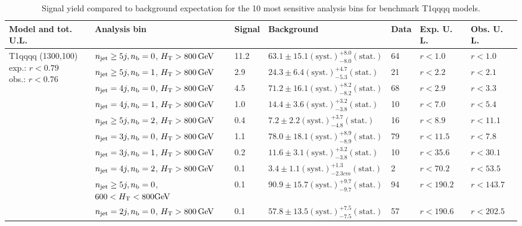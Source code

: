 \begin{table}[h!] 
  \scriptsize
  \caption{ 
Signal yield compared to background expectation for the 10 most sensitive analysis bins 
for benchmark T1qqqq models.
  \label{tab:sigBenchmarksYields_T1qqqq}}
  \centering 
  \begin{tabular}{ lllllll } 
    \hline 
    \hline 
    Model and tot. U.L. & Analysis bin & Signal & Background & Data & Exp. U. L. & Obs. U. L. \\ \hline
\multirow{10}{*}{\parbox[t]{2.3cm}{T1qqqq (1300,100)\\exp.: $r<0.79$\\obs.: $r<0.76$}}
 & $n_{\mathrm{jet}} \geq5j,n_{\text{b}} =0$, $\mbox{$H_\text{T}$} > 800 \, \mathrm{GeV}$ & 11.2 & $63.1 \pm 15.1 \mathrm{(syst.)} ^{+8.0}_{-8.0} \mathrm{(stat.)}$ & 64 & $r < 1.0$ & $r < 1.0$\\ 
 & $n_{\mathrm{jet}} \geq5j,n_{\text{b}} =1$, $\mbox{$H_\text{T}$} > 800 \, \mathrm{GeV}$ & 2.9 & $24.3 \pm 6.4 \mathrm{(syst.)} ^{+4.7}_{-5.3} \mathrm{(stat.)}$ & 21 & $r < 2.2$ & $r < 2.1$\\ 
 & $n_{\mathrm{jet}} =4j,n_{\text{b}} =0$, $\mbox{$H_\text{T}$} > 800 \, \mathrm{GeV}$ & 4.5 & $71.2 \pm 16.1 \mathrm{(syst.)} ^{+8.2}_{-8.2} \mathrm{(stat.)}$ & 68 & $r < 2.9$ & $r < 3.3$\\ 
 & $n_{\mathrm{jet}} =4j,n_{\text{b}} =1$, $\mbox{$H_\text{T}$} > 800 \, \mathrm{GeV}$ & 1.0 & $14.4 \pm 3.6 \mathrm{(syst.)} ^{+3.2}_{-3.8} \mathrm{(stat.)}$ & 10 & $r < 7.0$ & $r < 5.4$\\ 
 & $n_{\mathrm{jet}} \geq5j,n_{\text{b}} =2$, $\mbox{$H_\text{T}$} > 800 \, \mathrm{GeV}$ & 0.4 & $7.2 \pm 2.2 \mathrm{(syst.)} ^{+3.7}_{-4.8} \mathrm{(stat.)}$ & 16 & $r < 8.9$ & $r < 11.1$\\ 
 & $n_{\mathrm{jet}} =3j,n_{\text{b}} =0$, $\mbox{$H_\text{T}$} > 800 \, \mathrm{GeV}$ & 1.1 & $78.0 \pm 18.1 \mathrm{(syst.)} ^{+8.9}_{-8.9} \mathrm{(stat.)}$ & 79 & $r < 11.5$ & $r < 7.8$\\ 
 & $n_{\mathrm{jet}} =3j,n_{\text{b}} =1$, $\mbox{$H_\text{T}$} > 800 \, \mathrm{GeV}$ & 0.2 & $11.6 \pm 3.1 \mathrm{(syst.)} ^{+3.2}_{-3.8} \mathrm{(stat.)}$ & 10 & $r < 35.6$ & $r < 30.1$\\ 
 & $n_{\mathrm{jet}} =4j,n_{\text{b}} =2$, $\mbox{$H_\text{T}$} > 800 \, \mathrm{GeV}$ & 0.1 & $3.4 \pm 1.1 \mathrm{(syst.)} ^{+1.3}_{-2.3cm} \mathrm{(stat.)}$ & 2 & $r < 70.2$ & $r < 53.5$\\ 
 & $n_{\mathrm{jet}} \geq5j,n_{\text{b}} =0$, $600 < \mbox{$H_\text{T}$} < 800 \mathrm{GeV}$ & 0.1 & $90.9 \pm 15.7 \mathrm{(syst.)} ^{+9.7}_{-9.7} \mathrm{(stat.)}$ & 94 & $r < 190.2$ & $r < 143.7$\\ 
 & $n_{\mathrm{jet}} =2j,n_{\text{b}} =0$, $\mbox{$H_\text{T}$} > 800 \, \mathrm{GeV}$ & 0.1 & $57.8 \pm 13.5 \mathrm{(syst.)} ^{+7.5}_{-7.5} \mathrm{(stat.)}$ & 57 & $r < 190.6$ & $r < 202.5$\\ \hline

\end{tabular}
\end{table}
